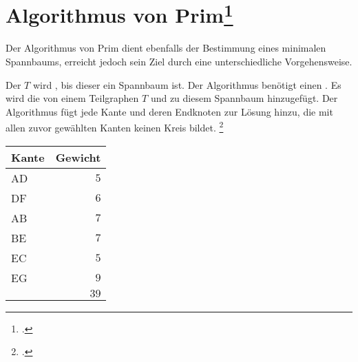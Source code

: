 \documentclass{lehramt-informatik-haupt}
\begin{document}
%

\section{Algorithmus von Prim\footcite{wiki:prim}}

Der Algorithmus von Prim dient ebenfalls der Bestimmung eines minimalen
Spannbaums, erreicht jedoch sein Ziel durch eine unterschiedliche
Vorgehensweise.

Der  $T$ wird , bis
dieser ein Spannbaum ist. Der Algorithmus benötigt einen
. Es wird die  von
einem Teilgraphen $T$  und zu diesem
Spannbaum hinzugefügt. Der Algorithmus fügt jede Kante und deren
Endknoten zur Lösung hinzu, die mit allen zuvor gewählten Kanten keinen
Kreis bildet.
\footcite[Seite 32, (PDF 26)]{aud:fs:6}

\begin{minipage}{7cm}
\end{minipage}
\begin{minipage}{4cm}
\begin{center}
\begin{tabular}{|l|r|}
\hline
Kante & Gewicht\\\hline\hline
AD & $5$\\
DF & $6$\\
AB & $7$\\
BE & $7$\\
EC & $5$\\
EG & $9$\\\hline
   & $39$\\\hline
\end{tabular}
\end{center}
\end{minipage}

\literatur
\end{document}
